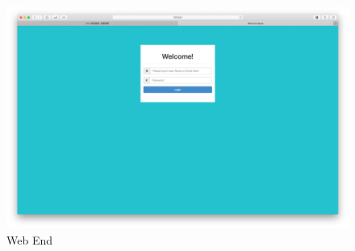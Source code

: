 \documentclass{article}
\begin{document}
 	 \begin{figure}[H]
 	 \centering
 		\includegraphics[width=\linewidth]{img/login1.png}
 		\caption{Web End}
 	\end{figure}
 
\end{document}
